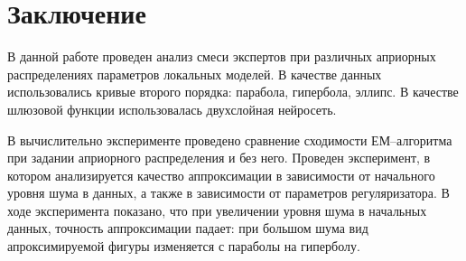 \documentclass[12pt, twoside]{article}
\numberwithin{equation}{section}
\begin{document}
\section{Заключение}
В данной работе проведен анализ смеси экспертов при различных априорных распределениях параметров локальных моделей. В качестве данных использовались кривые второго порядка: парабола, гипербола, эллипс. В качестве шлюзовой функции использовалась двухслойная нейросеть.

В вычислительно эксперименте проведено сравнение сходимости ЕМ--алгоритма при задании априорного распределения и без него. Проведен эксперимент, в котором анализируется качество аппроксимации в зависимости от начального уровня шума в данных, а также в зависимости от параметров регуляризатора. В ходе эксперимента показано, что при увеличении уровня шума в начальных данных, точность аппроксимации падает: при большом шума вид апроксимируемой фигуры изменяется с параболы на гиперболу.
\end{document}
